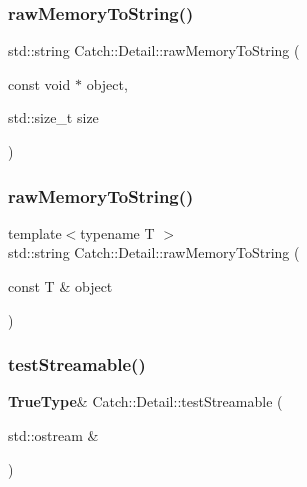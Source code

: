 \mbox{\label{namespace_catch_1_1_detail_ac5d6c510e565ee5bddcc2236194ce29e}} 
\subsubsection{raw\+Memory\+To\+String()\hspace{0.1cm}{\footnotesize\ttfamily [1/2]}}
{\footnotesize\ttfamily std\+::string Catch\+::\+Detail\+::raw\+Memory\+To\+String (\begin{DoxyParamCaption}\item[{const void $\ast$}]{object,  }\item[{std\+::size\+\_\+t}]{size }\end{DoxyParamCaption})}

\mbox{\label{namespace_catch_1_1_detail_a371620ed524abfcae5c3772bf49b563a}} 
\subsubsection{raw\+Memory\+To\+String()\hspace{0.1cm}{\footnotesize\ttfamily [2/2]}}
{\footnotesize\ttfamily template$<$typename T $>$ \\
std\+::string Catch\+::\+Detail\+::raw\+Memory\+To\+String (\begin{DoxyParamCaption}\item[{const T \&}]{object }\end{DoxyParamCaption})\hspace{0.3cm}{\ttfamily [inline]}}

\mbox{\label{namespace_catch_1_1_detail_aff0ca0f561ad8053654ab27d54486197}} 
\subsubsection{test\+Streamable()\hspace{0.1cm}{\footnotesize\ttfamily [1/2]}}
{\footnotesize\ttfamily \textbf{ True\+Type}\& Catch\+::\+Detail\+::test\+Streamable (\begin{DoxyParamCaption}\item[{std\+::ostream \&}]{ }\end{DoxyParamCaption})}

